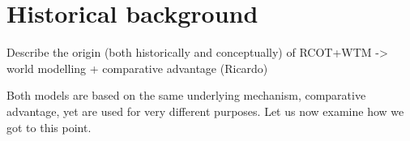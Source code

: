 \section{Historical background}

Describe the origin (both historically and conceptually) of RCOT+WTM -> world modelling + comparative advantage (Ricardo)

Both models are based on the same underlying mechanism, comparative advantage, yet are used for very different purposes. Let us now examine how we got to this point.